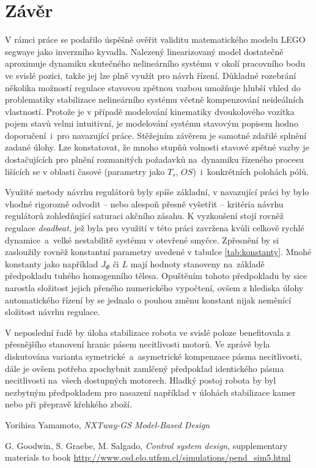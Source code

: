 \documentclass[conference]{IEEEtran}
\begin{document}
\section{Závěr}
V rámci práce se podařilo úspěšně ověřit validitu matematického modelu LEGO segwaye jako inverzního kyvadla.
Nalezený linearizovaný model dostatečně aproximuje dynamiku skutečného nelineárního systému v okolí pracovního bodu ve svislé pozici,
takže jej lze plně využít pro návrh řízení. Důkladné rozebrání několika možností regulace stavovou zpětnou vazbou umožňuje
hlubší vhled do problematiky stabilizace nelineárního systému včetně kompenzování neideálních vlastností.
Protože je v případě modelování kinematiky dvoukolového vozítka pojem stavů velmi intuitivní, je modelování systému stavovým popisem
hodno doporučení~i~pro navazující práce.  Stěžejním závěrem je samotné zdařilé splnění zadané úlohy.
Lze konstatovat, že mnoho stupňů volnosti stavové zpětné vazby je dostačujících pro plnění rozmanitých požadavků na~dynamiku řízeného procesu
lišících se v oblasti časové (parametry jako $T_s$, $OS$)~i~konkrétních polohách pólů.

Využité metody návrhu regulátorů byly spíše základní, v navazující práci by bylo vhodné rigorozně odvodit -- nebo alespoň
přesně vyšetřit -- kritéria návrhu regulátorů zohledňující saturaci akčního zásahu.
K vyzkoušení stojí rovněž regulace \textit{deadbeat}, jež byla pro využití v této práci zavržena kvůli celkově rychlé dynamice~a~velké nestabilitě
systému v otevřené smyčce. Zpřesnění by si zasloužily rovněž konstantní parametry uvedené v tabulce \ref{tab:konstanty}.
Mnohé konstanty jako například $J_\varPhi$ či $L$ mají hodnoty stanoveny na~základě předpokladu tuhého homogenního tělesa.
Opuštěním tohoto předpokladu by sice narostla složitost jejich přeného numerického vypočtení, ovšem z hlediska úlohy automatického řízení
by se jednalo o pouhou změnu konstant nijak neměnící složitost návrhu regulace.

V neposlední řadě by úloha stabilizace robota ve svislé poloze benefitovala z přesnějšího stanovení hranic pásem necitlivosti
motorů. Ve zprávě byla diskutována varianta symetrické~a~asymetrické kompenzace pásma necitlivosti, dále je ovšem potřeba zpochybnit
zamlčený předpoklad identického pásma necitlivosti na~všech dostupných motorech. Hladký postoj robota by byl nezbytným předpokladem
pro nasazení například v úlohách stabilizace kamer nebo při přepravě křehkého zboží.



\begin{thebibliography}{9}
    
    Yorihisa Yamamoto, \emph{NXTway-GS Model-Based Design} 
    
     G. Goodwin, S. Graebe, M. Salgado, \emph{Control system design}, supplementary materials to book \url{http://www.csd.elo.utfsm.cl/simulations/pend_sim5.html}
    
\end{thebibliography}
\end{document}
